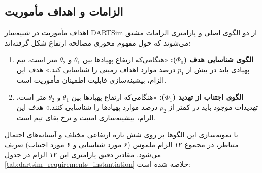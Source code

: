 \documentclass[oneside,openany,a4paper,12pt]{article}
\begin{document}
\subsection{الزامات و اهداف مأموریت}
اهداف مأموریت در شبیه‌ساز DARTSim از دو الگوی اصلی و پارامتری الزامات مشتق می‌شوند که حول مفهوم محوری مصالحه ارتفاع شکل گرفته‌اند:
\begin{enumerate}
    \item \textbf{الگوی شناسایی هدف ($\Phi_0$):} «هنگامی‌که ارتفاع پهپادها بین $\theta_1$ و $\theta_2$ متر است، تیم پهپادی باید در بیش از $p_1$ درصد موارد اهداف زمینی را شناسایی کند.» هدف این الزام، بیشینه‌سازی قابلیت اطمینان مأموریت است.
    \item \textbf{الگوی اجتناب از تهدید ($\Phi_1$):} «هنگامی‌که ارتفاع پهپادها بین $\theta_1$ و $\theta_2$ متر است، تهدیدات موجود باید در کمتر از $p_2$ درصد موارد پهپادها را شناسایی کنند.» هدف این الزام، بیشینه‌سازی امنیت و نرخ بقای تیم است.
\end{enumerate}

با نمونه‌سازی این الگوها بر روی شش بازه ارتفاعی مختلف و آستانه‌های احتمال متناظر، در مجموع ۱۲ الزام ملموس (۶ مورد شناسایی و ۶ مورد اجتناب) تعریف می‌شود. مقادیر دقیق پارامتری این ۱۲ الزام در جدول \ref{tab:dartsim_requirements_instantiation} خلاصه شده است:
\end{document}
